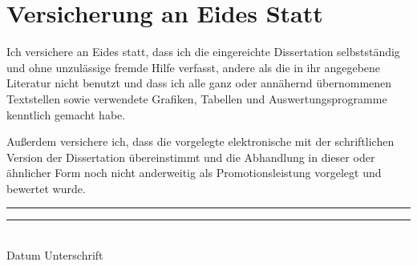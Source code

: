 \chapter*{Versicherung an Eides Statt}

Ich versichere an Eides statt, dass ich die eingereichte Dissertation selbstständig und ohne unzulässige fremde Hilfe verfasst, andere als die in ihr angegebene Literatur nicht benutzt und dass ich alle ganz oder annähernd übernommenen Textstellen sowie verwendete Grafiken, Tabellen und Auswertungsprogramme kenntlich gemacht habe.

Außerdem versichere ich, dass die vorgelegte elektronische mit der schriftlichen Version der Dissertation übereinstimmt und die Abhandlung in dieser oder ähnlicher Form noch nicht anderweitig als Promotionsleistung vorgelegt und bewertet wurde.

\vspace{1cm}
\noindent
\rule{45mm}{0.1pt} \hfill{} \rule{45mm}{0.1pt}\\
Datum \hfill{} Unterschrift

\cleardoublepage{}